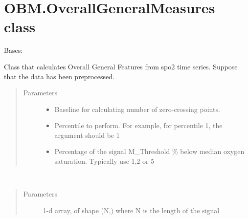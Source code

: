 \documentclass[letterpaper,10pt,english]{sphinxmanual}
\begin{document}
\section{OBM.OverallGeneralMeasures class}
\label{\detokenize{OBM:module-OBM.OverallGeneralMeasures}}\label{\detokenize{OBM:obm-overallgeneralmeasures-class}}

\begin{fulllineitems}
\label{\detokenize{OBM:OBM.OverallGeneralMeasures.OverallGeneralMeasures}}
Bases: 

Class that calculates Overall General Features from spo2 time series.
Suppose that the data has been preprocessed.
\begin{quote}\begin{description}
\item[{Parameters}] \leavevmode\begin{itemize}
\item {} 
 \textendash{} Baseline for calculating number of zero-crossing points.

\item {} 
 \textendash{} Percentile to perform. For example, for percentile 1, the argument should be 1

\item {} 
 \textendash{} Percentage of the signal M\_Threshold \% below median oxygen saturation. Typically use 1,2 or 5

\end{itemize}

\end{description}\end{quote}

\begin{fulllineitems}
\label{\detokenize{OBM:OBM.OverallGeneralMeasures.OverallGeneralMeasures.compute}}~\begin{quote}\begin{description}
\item[{Parameters}] \leavevmode
{} \textendash{} 1-d array, of shape (N,) where N is the length of the signal


\end{description}
\end{quote}
\end{fulllineitems}
\end{fulllineitems}
\end{document}
